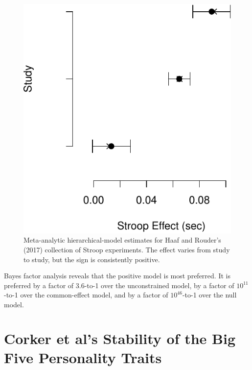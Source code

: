 \documentclass[english,man]{apa6}
\theoremstyle{definition}
\theoremstyle{definition}
\theoremstyle{definition}
\theoremstyle{remark}
\begin{document}
\begin{figure}[htbp]
\centering
\includegraphics{p_files/figure-latex/hrEst-1.pdf}
\caption{\label{fig:hrEst}Meta-analytic hierarchical-model estimates for
Haaf and Rouder's (2017) collection of Stroop experiments. The effect
varies from study to study, but the sign is consistently positive.}
\end{figure}

Bayes factor analysis reveals that the positive model is most preferred.
It is preferred by a factor of 3.6-to-1 over the unconstrained model, by
a factor of \(10^{11}\)-to-1 over the common-effect model, and by a
factor of \(10^{46}\)-to-1 over the null model.

\section{Corker et al's Stability of the Big Five Personality
Traits}\label{corker-et-als-stability-of-the-big-five-personality-traits}
\end{document}
